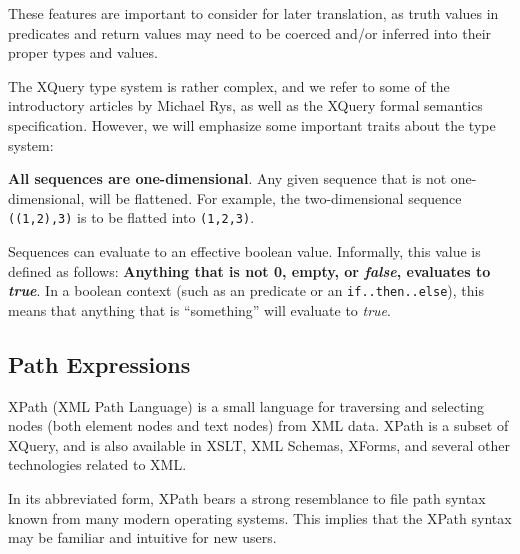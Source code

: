 These features are important to consider for later translation, as truth values
in predicates and return values may need to be coerced and/or inferred into
their proper types and values.

The XQuery type system is rather complex, and we refer to some of the
introductory articles\cite{rys_xq_type_intro} by Michael Rys, as well as the
XQuery formal semantics specification\cite{xquery_semantics}. However, we will
emphasize some important traits about the type system: 

\textbf{All sequences are one-dimensional}. Any given sequence that is not
one-dimensional, will be flattened. For example, the two-dimensional sequence
\verb!((1,2),3)! is to be flatted into \verb!(1,2,3)!.

Sequences can evaluate to an effective boolean value. Informally, this value is defined as follows:
\textbf{Anything that is not 0, empty, or \textit{false}, evaluates to \textit{true}}. In a boolean context (such
as an predicate or an \texttt{if..then..else}), this means that anything that is ``something'' will evaluate to
\textit{true}.


\subsection{Path Expressions}
\label{sect:theory:xquery:PathExpressions}
XPath (XML Path Language) is a small language for traversing and selecting
nodes (both element nodes and text nodes) from XML data. XPath is a subset of
XQuery, and is also available in XSLT, XML Schemas, XForms, and several other
technologies related to XML. 

In its abbreviated form, XPath bears a strong resemblance to file path syntax
known from many modern operating systems. This implies that the XPath syntax
may be familiar and intuitive for new users.

